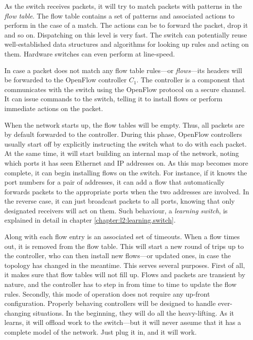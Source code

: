 As the switch receives packets, it will try to match packets with
patterns in the \textit{flow table}.
%
The flow table contains a set of patterns and associated actions to
perform in the case of a match.  The actions can be to forward the packet,
drop it and so on.
%
Dispatching on this level is very fast.  The switch can potentially reuse
well-established data structures and algorithms for looking up rules and
acting on them.  Hardware switches can even perform at line-speed.

In case a packet does not match any flow table rules---or
\textit{flows}---its headers will be forwarded to the OpenFlow controller
$C_1$.
%
The controller is a component that communicates with the switch using the
OpenFlow protocol on a secure channel.
%
It can issue commands to the switch, telling it to install flows or perform
immediate actions on the packet.

When the network starts up, the flow tables will be empty.
Thus, all packets are by default forwarded to the controller.
%
During this phase, OpenFlow controllers usually start off by explicitly
instructing the switch what to do with each packet.
At the same time, it will start building an internal map of the network,
noting which ports it has seen Ethernet and IP addresses on.
%
As this map becomes more complete, it can begin installing flows on the
switch.
%
For instance, if it knows the port numbers for a pair of addresses, it can
add a flow that automatically forwards packets to the appropriate ports when
the two addresses are involved.
%
In the reverse case, it can just broadcast packets to all ports, knowing
that only designated receivers will act on them.
%
Such behaviour, a \textit{learning switch}, is explained in detail in
chapter \vref{chapter:l2:learning.switch}.

Along with each flow entry is an associated set of timeouts.  When a flow
times out, it is removed from the flow table.  This will start a new round
of trips up to the controller, who can then install new flows---or updated
ones, in case the topology has changed in the meantime.
%
This serves several purposes.  First of all, it makes sure that flow tables
will not fill up.  Flows and packets are transient by nature, and the
controller has to step in from time to time to update the flow rules.
%
Secondly, this mode of operation does not require any up-front
configuration.
%
Properly behaving controllers will be designed to handle ever-changing
situations.  In the beginning, they will do all the heavy-lifting.
As it learns, it will offload work to the switch---but it will never assume
that it has a complete model of the network.
%
Just plug it in, and it will work.

